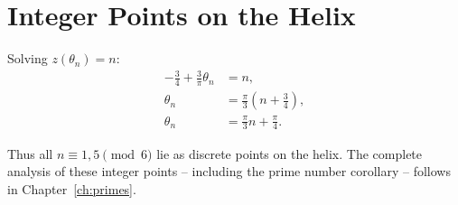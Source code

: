 \section{Integer Points on the Helix}

Solving $z(\theta_n) = n$:
\begin{align}
-\frac{3}{4} + \frac{3}{\pi}\theta_n &= n, \\
\theta_n &= \frac{\pi}{3}\left(n + \frac{3}{4}\right), \\
\theta_n &= \frac{\pi}{3}n + \frac{\pi}{4}.
\end{align}

Thus all $n \equiv 1,5 \pmod{6}$ lie as discrete points on the
helix. The complete analysis of these integer points -- including
the prime number corollary -- follows in Chapter~\ref{ch:primes}.
